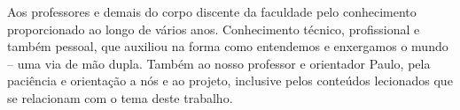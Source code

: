 
\OnehalfSpacing

\imprimircapa

\imprimirfolhaderosto





\begin{agradecimentos}[Agradecimentos]
Aos professores e demais do corpo discente da faculdade pelo conhecimento proporcionado ao longo de vários anos. Conhecimento técnico, profissional e também pessoal, que auxiliou na forma como entendemos e enxergamos o mundo -- uma via de mão dupla. Também ao nosso professor e orientador Paulo, pela paciência e orientação a nós e ao projeto, inclusive pelos conteúdos lecionados que se relacionam com o tema deste trabalho.
\end{agradecimentos}



